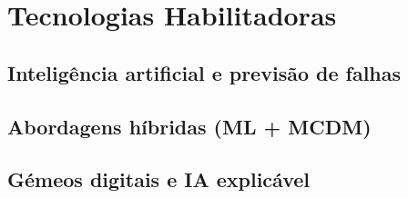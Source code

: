 \section{Tecnologias Habilitadoras}
\subsection{Inteligência artificial e previsão de falhas}
\subsection{Abordagens híbridas (ML + MCDM)}
\subsection{Gémeos digitais e IA explicável}
